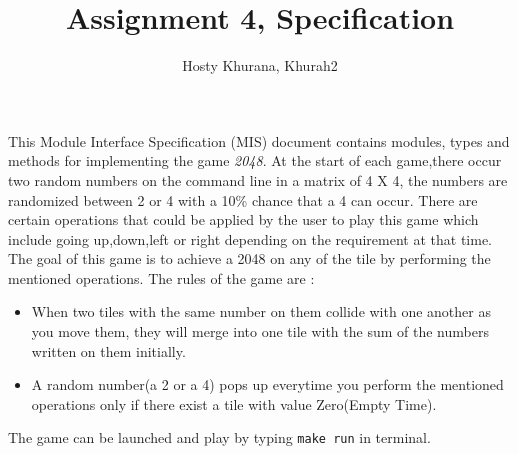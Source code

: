 \documentclass[12pt]{article}
\title{Assignment 4, Specification}
\author{Hosty Khurana, Khurah2}
\newcommand{\authornote}[3]{\textcolor{#1}{[#3 ---#2]}}
\newcommand{\authornote}[3]{}
\newcommand{\wss}[1]{\authornote{blue}{SS}{#1}}
\begin{document}
\maketitle
This Module Interface Specification (MIS) document contains modules, types and
methods for implementing the game \textit{2048}. At the start of each game,there occur two random numbers on the command line in a matrix of 4 X 4, the numbers are randomized between 2 or 4 with a 10\% chance that a 4 can occur. There are certain operations that could be applied by the user to play this game which include going up,down,left or right depending on the requirement at that time. The goal of this game is to achieve a 2048 on any of the tile by performing the mentioned operations. The rules of the game are :\\
\begin{itemize}
  \item  When two tiles with the same number on them collide with one another as you move them, they will merge into one tile with the sum of the numbers written on them initially.
 \item A random number(a 2 or a 4) pops up everytime you perform the mentioned operations only if there exist a tile with value Zero(Empty Time).
 \end{itemize} The game can be launched and play by typing \texttt{make run} in terminal.






% 
% 
\end{document}

